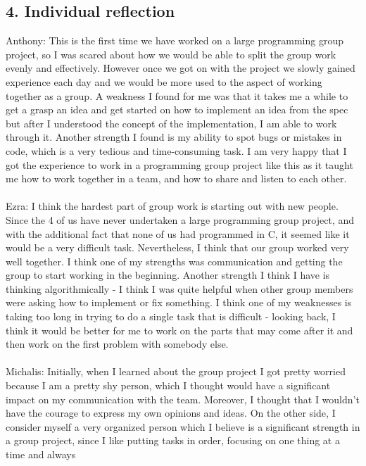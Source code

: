 \documentclass[a4paper]{article}
\begin{document}
\subsection*{4. Individual reflection}

Anthony: This is the first time we have worked on a large programming group project, so I was scared about how we would be 
able to split the group work evenly and effectively. However once we got on with the project we slowly gained experience 
each day and we would be more used to the aspect of working together as a group. A weakness I found for me was that it 
takes me a while to get a grasp an idea and get started on how to implement an idea from the spec but after I understood 
the concept of the implementation, I am able to work through it. Another strength I found is my ability to spot bugs or 
mistakes in code, which is a very tedious and time-consuming task. I am very happy that I got the experience to work in a 
programming group project like this as it taught me how to work together in a team, and how to share and listen to each other.
\\ \\
Ezra: I think the hardest part of group work is starting out with new people. Since the 4 of us have never undertaken a 
large programming group project, and with the additional fact that none of us had programmed in C, it seemed like it would
be a very difficult task. Nevertheless, I think that our group worked very well together. I think one of my strengths was 
communication and getting the group to start working in the beginning. Another strength I think I have is thinking algorithmically - 
I think I was quite helpful when other group members were asking how to implement or fix something. I think one of my weaknesses is 
taking too long in trying to do a single task that is difficult - looking back, I think it would be better for me to work on the parts 
that may come after it and then work on the first problem with somebody else.
\\ \\
Michalis: Initially, when I learned about the group project I got pretty worried because I am a pretty shy person, which 
I thought would have a significant impact on my communication with the team. Moreover, I thought that I wouldn't have the courage 
to express my own opinions and ideas. On the other side, I consider myself a very organized person which I believe is 
a significant strength in a group project, since I like putting tasks in order, focusing on one thing at a time and always 
\end{document}
